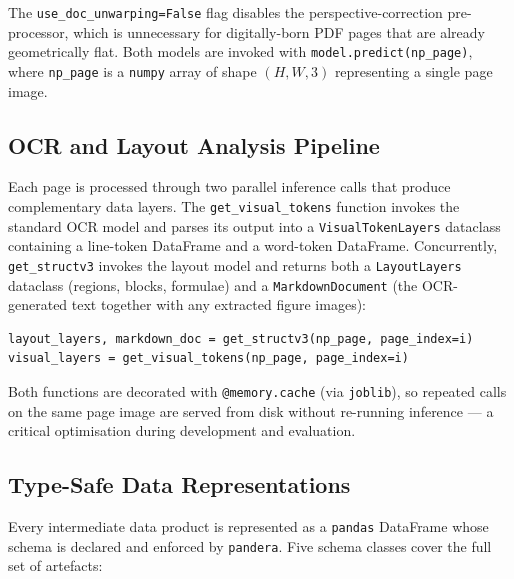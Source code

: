 \documentclass{article}
\theoremstyle{definition}
\begin{document}
The \texttt{use\_doc\_unwarping=False} flag disables the perspective-correction
pre-processor, which is unnecessary for digitally-born PDF pages that are
already geometrically flat.  Both models are invoked with
\texttt{model.predict(np\_page)}, where \texttt{np\_page} is a
\texttt{numpy} array of shape $(H, W, 3)$ representing a single page image.

\subsection{OCR and Layout Analysis Pipeline}
\label{sec:ocr-pipeline}

Each page is processed through two parallel inference calls that produce
complementary data layers.  The \texttt{get\_visual\_tokens} function
invokes the standard OCR model and parses its output into a
\texttt{VisualTokenLayers} dataclass containing a line-token DataFrame and a
word-token DataFrame.  Concurrently, \texttt{get\_structv3} invokes the
layout model and returns both a \texttt{LayoutLayers} dataclass (regions,
blocks, formulae) and a \texttt{MarkdownDocument} (the OCR-generated text
together with any extracted figure images):

\begin{lstlisting}
layout_layers, markdown_doc = get_structv3(np_page, page_index=i)
visual_layers = get_visual_tokens(np_page, page_index=i)
\end{lstlisting}

Both functions are decorated with \texttt{@memory.cache} (via
\texttt{joblib}), so repeated calls on the same page image are served from
disk without re-running inference --- a critical optimisation during
development and evaluation.

\subsection{Type-Safe Data Representations}
\label{sec:types}

Every intermediate data product is represented as a \texttt{pandas}
DataFrame whose schema is declared and enforced by \texttt{pandera}.  Five
schema classes cover the full set of artefacts:
\end{document}
